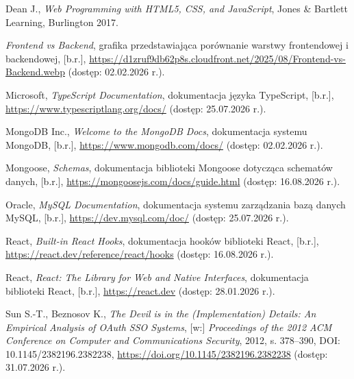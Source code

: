 \documentclass[12pt,a4paper,twoside]{report}
\begin{document}
\begin{list}{}{\setlength{\leftmargin}{0pt}\setlength{\itemindent}{0pt}\setlength{\labelwidth}{0pt}\setlength{\labelsep}{0pt}\setlength{\itemsep}{0.5\baselineskip}}
\item {\RaggedRight Dean J., \emph{Web Programming with HTML5, CSS, and JavaScript}, Jones \& Bartlett Learning, Burlington 2017.\par}

\item {\RaggedRight \emph{Frontend vs Backend}, grafika przedstawiająca porównanie warstwy frontendowej i backendowej, [b.r.], \url{https://d1zruf9db62p8s.cloudfront.net/2025/08/Frontend-vs-Backend.webp} (dostęp: 02.02.2026 r.).\par}

\item {\RaggedRight Microsoft, \emph{TypeScript Documentation}, dokumentacja języka TypeScript, [b.r.], \url{https://www.typescriptlang.org/docs/} (dostęp: 25.07.2026 r.).\par}

\item {\RaggedRight MongoDB Inc., \emph{Welcome to the MongoDB Docs}, dokumentacja systemu MongoDB, [b.r.], \url{https://www.mongodb.com/docs/} (dostęp: 02.02.2026 r.).\par}

\item {\RaggedRight Mongoose, \emph{Schemas}, dokumentacja biblioteki Mongoose dotycząca schematów danych, [b.r.], \url{https://mongoosejs.com/docs/guide.html} (dostęp: 16.08.2026 r.).\par}

\item {\RaggedRight Oracle, \emph{MySQL Documentation}, dokumentacja systemu zarządzania bazą danych MySQL, [b.r.], \url{https://dev.mysql.com/doc/} (dostęp: 25.07.2026 r.).\par}

\item {\RaggedRight React, \emph{Built-in React Hooks}, dokumentacja hooków biblioteki React, [b.r.], \url{https://react.dev/reference/react/hooks} (dostęp: 16.08.2026 r.).\par}

\item {\RaggedRight React, \emph{React: The Library for Web and Native Interfaces}, dokumentacja biblioteki React, [b.r.], \url{https://react.dev} (dostęp: 28.01.2026 r.).\par}

\item {\RaggedRight Sun S.-T., Beznosov K., \emph{The Devil is in the (Implementation) Details: An Empirical Analysis of OAuth SSO Systems}, [w:] \emph{Proceedings of the 2012 ACM Conference on Computer and Communications Security}, 2012, s. 378--390, DOI: 10.1145/2382196.2382238, \url{https://doi.org/10.1145/2382196.2382238} (dostęp: 31.07.2026 r.).\par}


\end{list}
\end{document}
